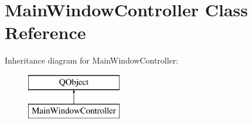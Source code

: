 \hypertarget{classMainWindowController}{\section{Main\+Window\+Controller Class Reference}
\label{classMainWindowController}
}
Inheritance diagram for Main\+Window\+Controller\+:\begin{figure}[H]
\begin{center}
\leavevmode
\includegraphics[height=2.000000cm]{classMainWindowController}
\end{center}
\end{figure}
